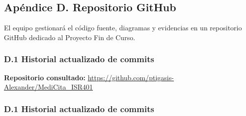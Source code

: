 \documentclass[11pt,a4paper]{article}
\begin{document}
	
	
	\subsection{Apéndice D. Repositorio GitHub}
	
	El equipo gestionará el código fuente, diagramas y evidencias en un repositorio GitHub dedicado al Proyecto Fin de Curso.
	
	
	\subsubsection{D.1 Historial actualizado de commits}
	

	\noindent
	\textbf{Repositorio consultado:}
	\url{https://github.com/ptigasis-Alexander/MediCita_ISR401}
	
	\subsubsection{D.1 Historial actualizado de commits}
	

	\begingroup
	\scriptsize
	\setlength{\tabcolsep}{3pt}
	\renewcommand{\arraystretch}{1.15}
	
\end{document}
